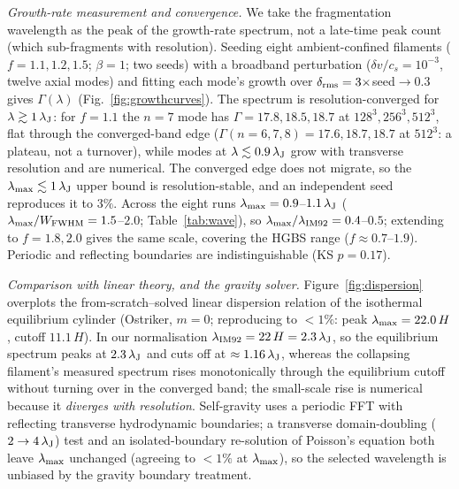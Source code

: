 \documentclass[usenatbib,twoside,twocolumn]{mnras}
\begin{document}
\emph{Growth-rate measurement and convergence.} We take the fragmentation wavelength as the peak of the growth-rate spectrum, not a late-time peak count (which sub-fragments with resolution). Seeding eight ambient-confined filaments ($f=1.1,1.2,1.5$; $\beta=1$; two seeds) with a broadband perturbation ($\delta v/c_s=10^{-3}$, twelve axial modes) and fitting each mode's growth over $\delta_{\rm rms}=3\times$seed$\to0.3$ gives $\Gamma(\lambda)$ (Fig.~\ref{fig:growthcurves}). The spectrum is resolution-converged for $\lambda\gtrsim1\,\lambda_{\rm J}$: for $f=1.1$ the $n=7$ mode has $\Gamma=17.8,18.5,18.7$ at $128^3,256^3,512^3$, flat through the converged-band edge ($\Gamma(n{=}6,7,8)=17.6,18.7,18.7$ at $512^3$: a plateau, not a turnover), while modes at $\lambda\lesssim0.9\,\lambda_{\rm J}$ grow with transverse resolution and are numerical. The converged edge does not migrate, so the $\lambda_{\rm max}\lesssim1\,\lambda_{\rm J}$ upper bound is resolution-stable, and an independent seed reproduces it to $3\%$. Across the eight runs $\lambda_{\rm max}=0.9$--$1.1\,\lambda_{\rm J}$ ($\lambda_{\rm max}/W_{\rm FWHM}=1.5$--$2.0$; Table~\ref{tab:wave}), so $\lambda_{\rm max}/\lambda_{\rm IM92}=0.4$--$0.5$; extending to $f=1.8,2.0$ gives the same scale, covering the HGBS range ($f\approx0.7$--$1.9$). Periodic and reflecting boundaries are indistinguishable (KS $p=0.17$).

\emph{Comparison with linear theory, and the gravity solver.} Figure~\ref{fig:dispersion} overplots the from-scratch--solved linear dispersion relation of the isothermal equilibrium cylinder (Ostriker, $m=0$; reproducing \citealt{Nagasawa1987,Inutsuka1992,Fischera2012} to $<1\%$: peak $\lambda_{\rm max}=22.0\,H$, cutoff $11.1\,H$). In our normalisation $\lambda_{\rm IM92}=22\,H=2.3\,\lambda_{\rm J}$, so the equilibrium spectrum peaks at $2.3\,\lambda_{\rm J}$ and cuts off at $\approx1.16\,\lambda_{\rm J}$, whereas the collapsing filament's measured spectrum rises monotonically through the equilibrium cutoff without turning over in the converged band; the small-scale rise is numerical because it \emph{diverges with resolution}. Self-gravity uses a periodic FFT with reflecting transverse hydrodynamic boundaries; a transverse domain-doubling ($2\to4\,\lambda_{\rm J}$) test and an isolated-boundary re-solution of Poisson's equation both leave $\lambda_{\rm max}$ unchanged (agreeing to $<1\%$ at $\lambda_{\rm max}$), so the selected wavelength is unbiased by the gravity boundary treatment.
\end{document}
